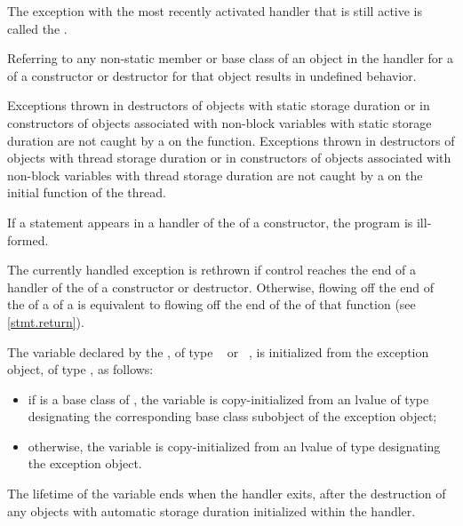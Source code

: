 \pnum
{}%
The exception with the most recently activated handler that is
still active is called the
.

\pnum
Referring to any non-static member or base class of an object
in the handler for a
of a constructor or destructor for that object results in undefined behavior.

\pnum
Exceptions thrown in destructors of objects with static storage duration or in
constructors of objects associated with non-block variables with static storage duration are not caught by a
on
the  function.
Exceptions thrown in destructors of objects with thread storage duration or in constructors of objects associated with non-block variables with thread storage duration are not caught by a
on the initial function of the thread.

\pnum
If a  statement appears in a handler of the
of a
constructor, the program is ill-formed.

\pnum
The currently handled exception
is rethrown if control reaches the end of a handler of the
of a constructor or destructor.
Otherwise, flowing off the end of
the 
of a 
of a 
is equivalent to flowing off the end of
the 
of that function (see \ref{stmt.return}).

\pnum
The variable declared by the , of type
\cv{}~ or \cv{}~, is initialized from the exception object,
of type , as follows:
\begin{itemize}
\item
if  is a base class of ,
the variable is copy-initialized
from an lvalue of type  designating the corresponding base class subobject
of the exception object;
\item otherwise, the variable is copy-initialized
from an lvalue of type  designating the exception object.
\end{itemize}

The lifetime of the variable ends
when the handler exits, after the
destruction of any objects with automatic storage duration initialized
within the handler.

